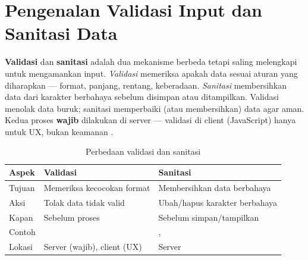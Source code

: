 \section{Pengenalan Validasi Input dan Sanitasi Data}

\textbf{Validasi} dan \textbf{sanitasi} adalah dua mekanisme berbeda tetapi saling melengkapi untuk mengamankan input. \textit{Validasi} memeriksa apakah data sesuai aturan yang diharapkan --- format, panjang, rentang, keberadaan. \textit{Sanitasi} membersihkan data dari karakter berbahaya sebelum disimpan atau ditampilkan. Validasi menolak data buruk; sanitasi memperbaiki (atau membersihkan) data agar aman. Kedua proses \textbf{wajib} dilakukan di server --- validasi di client (JavaScript) hanya untuk UX, bukan keamanan \cite{phpRightWay}.

\begin{table}[ht]
\centering
\begin{tabular}{|P{2cm}|P{5cm}|P{5.5cm}|}
\hline
\textbf{Aspek} & \textbf{Validasi} & \textbf{Sanitasi} \\
\hline
Tujuan & Memeriksa kecocokan format & Membersihkan data berbahaya \\
\hline
Aksi & Tolak data tidak valid & Ubah/hapus karakter berbahaya \\
\hline
Kapan & Sebelum proses & Sebelum simpan/tampilkan \\
\hline
Contoh &  & ,  \\
\hline
Lokasi & Server (wajib), client (UX) & Server \\
\hline
\end{tabular}
\caption{Perbedaan validasi dan sanitasi}
\end{table}

